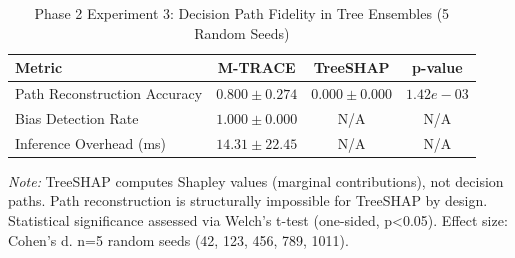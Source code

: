 
\begin{table}[h]
\centering
\caption{Phase 2 Experiment 3: Decision Path Fidelity in Tree Ensembles (5 Random Seeds)}
\label{tab:experiment3_path_fidelity}
\begin{tabular}{lccc}
\toprule
\textbf{Metric} & \textbf{M-TRACE} & \textbf{TreeSHAP} & \textbf{p-value} \\
\midrule
Path Reconstruction Accuracy & $0.800 \pm 0.274$ & $0.000 \pm 0.000$ & $1.42e-03$ \\
\midrule
Bias Detection Rate & $1.000 \pm 0.000$ & N/A & N/A \\
\midrule
Inference Overhead (ms) & $14.31 \pm 22.45$ & N/A & N/A \\
\bottomrule
\end{tabular}
\begin{flushleft}
\small
\textit{Note:} TreeSHAP computes Shapley values (marginal contributions), not decision paths.
Path reconstruction is structurally impossible for TreeSHAP by design.
Statistical significance assessed via Welch's t-test (one-sided, p<0.05). Effect size: Cohen's d.
n=5 random seeds (42, 123, 456, 789, 1011).
\end{flushleft}
\end{table}
